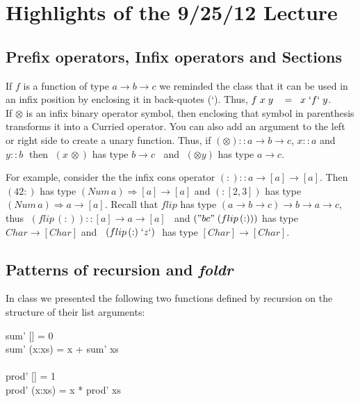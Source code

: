 \documentclass[11pt]{article}
\begin{document}


\section{ Highlights of the 9/25/12 Lecture}

\subsection{Prefix operators, Infix operators and Sections}

If $f$ is a function of type $a\rightarrow{}b\rightarrow{}c$ we reminded the
class that it can be used in an infix position by enclosing it in back-quotes
(`).  Thus, $f\; x\; y\;\;\ = \;\; x\; `f`\; y$.\\

If $\otimes$ is an infix binary operator symbol, then enclosing that symbol in
parenthesis transforms it into a Curried operator. You can also add an argument
to the left or right side to create a unary function.  Thus, if $(\otimes) ::
a\rightarrow{} b \rightarrow{}c$, $x::a$ and $y::b\;$ then $\;(x\,\otimes)$ has type $b\rightarrow{}c\;\;$ and $\;(\otimes{}y)$ has type $a\rightarrow{}c$.


For example, consider the the infix cons operator $(:) ::
a\rightarrow{}[a]\rightarrow[a]$.  Then $(42 :)$ has type $(Num\,a)\Rightarrow
[a] \rightarrow [a]$ and $(:[2,3])$ has type $(Num\,a)\Rightarrow a \rightarrow
[a]$.  Recall that $flip$ has type $ (a \rightarrow{} b \rightarrow{} c)
\rightarrow{} b \rightarrow{} a \rightarrow{} c$, thus $\;(flip \,(:)) :: [a]
\rightarrow{}a\rightarrow{}[a]\;\;$ and $("bc"\; (flip\,(:)))$ has type $Char
\rightarrow [Char]$ and $\;\;(flip\, (:)\; `z`)\;$ has type
$[Char]\rightarrow[Char]$.

\subsection{Patterns of recursion and {\it{foldr}}}

In class we presented the following two functions defined by recursion on the
structure of their list arguments:

\begin{program**}
\> sum' [] = 0\\
\> sum' (x:xs) = x + sum' xs\\
\> \\
\> prod' [] = 1\\
\> prod' (x:xs) = x * prod' xs\\
\end{program**}
\end{document}
